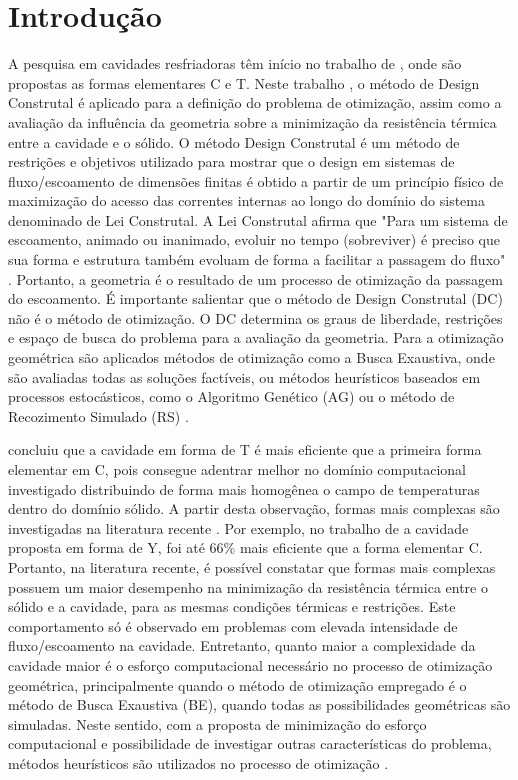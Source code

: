 \documentclass[12pt,A4,A4pt]{article}
\begin{document}
\newpage
 \onehalfspacing
\section{Introdução}

 {\fontsize{12pt}{\baselineskip}\selectfont}
 
\hspace{0.5cm}A pesquisa em cavidades resfriadoras têm início no trabalho de \cite{Biserni2004}, onde são propostas as formas elementares C e T. Neste trabalho \citep{Biserni2004}, o método de Design Construtal é aplicado para a definição do problema de otimização, assim como a avaliação da influência da geometria sobre a minimização da resistência térmica entre a cavidade e o sólido. O método Design Construtal é um método de restrições e objetivos utilizado para mostrar que o design em sistemas de fluxo/escoamento de dimensões finitas é obtido a partir de um princípio físico de maximização do acesso das correntes internas ao longo do domínio do sistema denominado de Lei Construtal. A Lei Construtal afirma que "Para um sistema de escoamento, animado ou inanimado, evoluir no tempo (sobreviver) é preciso que sua forma e estrutura também evoluam de forma a facilitar a passagem do fluxo" \citep{Bejan}. Portanto, a geometria é o resultado de um processo de otimização da passagem do escoamento. É importante salientar que o método de Design Construtal (DC) não é o método de otimização. O DC determina os graus de liberdade, restrições e espaço de busca do problema para a avaliação da geometria. Para a otimização geométrica são aplicados métodos de otimização como a Busca Exaustiva, onde são avaliadas todas as soluções factíveis, ou métodos heurísticos baseados em processos estocásticos, como o Algoritmo Genético (AG) ou o método de Recozimento Simulado (RS) \citep{Lorenzini2014,Gonzales2015energy}.

\cite{Biserni2004} concluiu que a cavidade em forma de T é mais eficiente que a primeira forma elementar em C, pois consegue adentrar melhor no domínio computacional investigado distribuindo de forma mais homogênea o campo de temperaturas dentro do domínio sólido. A partir desta observação, formas mais complexas são investigadas na literatura recente \citep{Biserni2007,Lorenzini2011,Lorenzini2014,Biserni2017}. Por exemplo, no trabalho de \cite{Lorenzini2011} a cavidade proposta em forma de Y, foi até 66\% mais eficiente que a forma elementar C. Portanto, na literatura recente, é possível constatar que formas mais complexas possuem um maior desempenho na minimização da resistência térmica entre o sólido e a cavidade, para as mesmas condições térmicas e restrições. Este comportamento só é observado em problemas com elevada intensidade de fluxo/escoamento na cavidade. Entretanto, quanto maior a complexidade da cavidade maior é o esforço computacional necessário no processo de otimização geométrica, principalmente quando o método de otimização empregado é o método de Busca Exaustiva (BE), quando todas as possibilidades geométricas são simuladas. Neste sentido, com a proposta de minimização do esforço computacional e possibilidade de investigar outras características do problema, métodos heurísticos são utilizados no processo de otimização \citep{Lorenzini2014, Gonzales2015energy, Gonzales2017, Biserni2017}.
\end{document}
